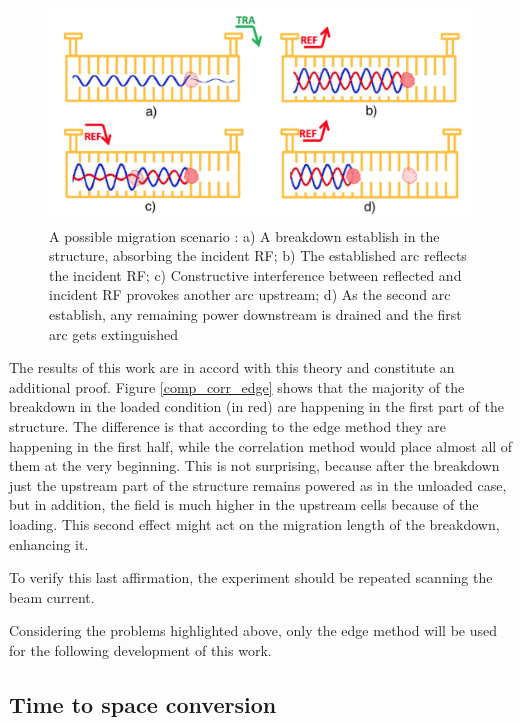 \begin{figure}[h]
\centering 
\includegraphics[scale=0.3]{pictures/migration_scenario}
\caption{A possible migration scenario \cite{Degiovanni:migration}: a) A breakdown establish in the structure, absorbing the incident RF; b) The established arc reflects the incident RF; c) Constructive interference between reflected and incident RF provokes another arc upstream; d) As the second arc establish, any remaining power downstream is drained and the first arc gets extinguished}
\label{mig_sc}
\end{figure}




The results of this work are in accord with this theory and constitute an additional proof. Figure \ref{comp_corr_edge} shows that the majority of the breakdown in the loaded condition (in red) are happening in the first part of the structure. The difference is that according to the edge method they are happening in the first half, while the correlation method would place almost all of them at the very beginning. 
This is not surprising, because after the breakdown just the upstream part of the structure remains powered as in the unloaded case, but in addition, the field is much higher in the upstream cells because of the loading. This second effect might act on the migration length of the breakdown, enhancing it. 

To verify this last affirmation, the experiment should be repeated scanning the beam current.

Considering the problems highlighted above, only the edge method will be used for the following development of this work.




\subsection[Time to space conversion]{Time to space conversion}

